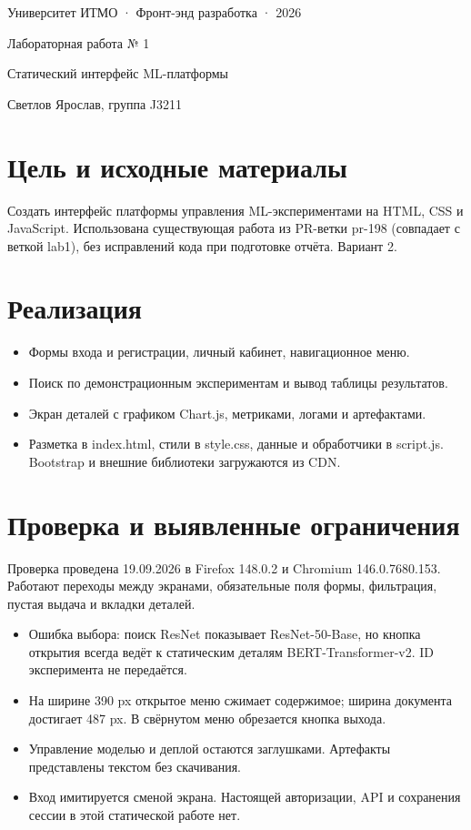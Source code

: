 \documentclass[11pt,a4paper]{article}
\begin{document}
\begin{center}
{\small Университет ИТМО · Фронт-энд разработка · 2026}\par
{\LARGE Лабораторная работа № 1}\par
{\large Статический интерфейс ML-платформы}\par
Светлов Ярослав, группа J3211
\end{center}
\section*{Цель и исходные материалы}
Создать интерфейс платформы управления ML-экспериментами на HTML, CSS и JavaScript. Использована существующая работа из PR-ветки pr-198 (совпадает с веткой lab1), без исправлений кода при подготовке отчёта. Вариант 2.
\section*{Реализация}
\begin{itemize}
\item Формы входа и регистрации, личный кабинет, навигационное меню.
\item Поиск по демонстрационным экспериментам и вывод таблицы результатов.
\item Экран деталей с графиком Chart.js, метриками, логами и артефактами.
\item Разметка в index.html, стили в style.css, данные и обработчики в script.js. Bootstrap и внешние библиотеки загружаются из CDN.
\end{itemize}

\section*{Проверка и выявленные ограничения}
Проверка проведена 19.09.2026 в Firefox 148.0.2 и Chromium 146.0.7680.153. Работают переходы между экранами, обязательные поля формы, фильтрация, пустая выдача и вкладки деталей.\begin{itemize}
\item Ошибка выбора: поиск ResNet показывает ResNet-50-Base, но кнопка открытия всегда ведёт к статическим деталям BERT-Transformer-v2. ID эксперимента не передаётся.
\item На ширине 390 px открытое меню сжимает содержимое; ширина документа достигает 487 px. В свёрнутом меню обрезается кнопка выхода.
\item Управление моделью и деплой остаются заглушками. Артефакты представлены текстом без скачивания.
\item Вход имитируется сменой экрана. Настоящей авторизации, API и сохранения сессии в этой статической работе нет.
\end{itemize}
\end{document}
